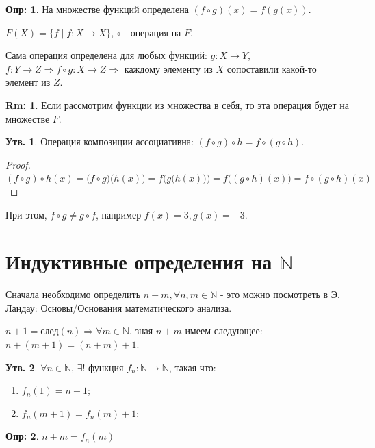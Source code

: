 \documentclass[12pt]{article}
\theoremstyle{definition}
\newtheorem{defn}{Опр:}
\newtheorem{rem}{Rm:}
\newtheorem{prop}{Утв.}
\begin{document}
\begin{defn}
	На множестве функций определена  $(f\circ g)(x) = f(g(x))$.
\end{defn}

$F(X) = \{f \mid f\colon X \rightarrow X\}$, $\circ$ - операция на $F$.

Сама операция определена для любых функций: $g \colon X \rightarrow Y$, $f\colon Y \rightarrow Z \Rightarrow f \circ g \colon X \rightarrow Z \Rightarrow$ каждому элементу из $X$ сопоставили какой-то элемент из $Z$.

\begin{rem}
	Если рассмотрим функции из множества в себя, то эта операция будет на множестве $F$.
\end{rem}

\begin{prop}
	Операция композиции ассоциативна: $(f\circ g) \circ h = f \circ (g \circ h)$.
\end{prop}

\begin{proof}
	 	$(f\circ g) \circ h (x) = \big(f\circ g\big) \big(h (x)\big) = f\Big( g\big(h(x)\big) \Big) = f \big( (g \circ h)(x) \big) = f \circ (g \circ h) (x)$
\end{proof}

При этом, $f \circ g \neq g \circ f$, например $f(x) = 3, g(x) = - 3$.

\section*{Индуктивные определения на $\mathbb{N}$}

Сначала необходимо определить $n + m, \forall n,m \in \mathbb{N}$ - это можно посмотреть в Э. Ландау: Основы/Основания математического анализа.

$n+1 = \text{след}(n) \Rightarrow \forall m \in \mathbb{N}$, зная $n+m$ имеем следующее: $n + (m+1) = (n+m) + 1$.

\begin{prop}
	$\forall n \in \mathbb{N},\, \exists!$ функция $f_n \colon \mathbb{N} \rightarrow \mathbb{N}$, такая что:
	\begin{enumerate}[label={(\arabic*)}]
		\item $f_n(1) = n + 1$;
		\item $f_n(m+1) = f_n(m) + 1$;
	\end{enumerate}
\end{prop}

\begin{defn}
	$n + m = f_n(m)$
\end{defn}
\end{document}
